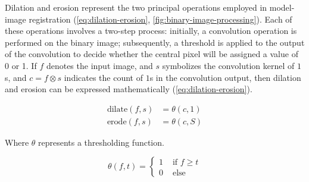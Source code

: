 Dilation and erosion represent the two principal operations employed in model-image registration (\cref{eq:dilation-erosion}, \cref{fig:binary-image-processing}).
Each of these operations involves a two-step process: initially, a convolution operation is performed on the binary image; subsequently, a threshold is applied to the output of the convolution to decide whether the central pixel will be assigned a value of 0 or 1.
If $f$ denotes the input image, and $s$ symbolizes the convolution kernel of $1$s, and $c=f\otimes s$ indicates the count of $1$s in the convolution output, then dilation and erosion can be expressed mathematically (\cref{eq:dilation-erosion}).

\begin{equation}
    \begin{aligned}
        \text{dilate}(f,s) &= \theta(c,1) \\
        \text{erode}(f,s) &= \theta(c,S) 
    \end{aligned}
    \label{eq:dilation-erosion}
\end{equation}

Where $\theta$ represents a thresholding function.

\begin{equation}
    \theta (f,t) = \begin{cases}
        1 &\text{ if } f\ge t \\
        0 &\text{ else}
    \end{cases}
\end{equation}

